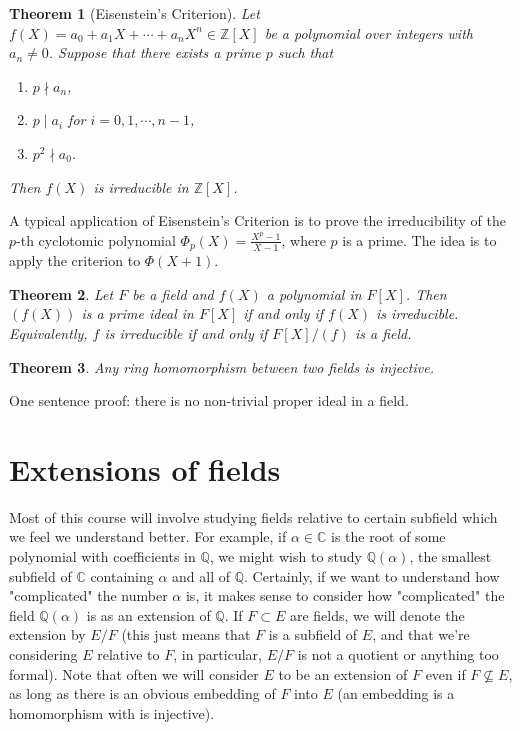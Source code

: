 \documentclass[12pt]{report}
\newtheorem{theorem}{Theorem}[section]
\theoremstyle{definition}
\newcommand{\ZZ}{\mathbb{Z}}
\newcommand{\CC}{\mathbb{C}}
\newcommand{\QQ}{\mathbb{Q}}
\begin{document}
\begin{theorem}[Eisenstein's Criterion]
	Let $f(X) = a_0+a_1X+\cdots+a_nX^n\in \ZZ[X]$ be a polynomial over integers with $a_n\not= 0$. Suppose that there exists a prime $p$ such that \begin{enumerate}
		\item  $p\nmid a_n$,
		\item  $p\mid a_i$  for  $i=0,1,\cdots,n-1$,
		\item  $p^2\nmid a_0$.
	\end{enumerate}
	Then $f(X)$ is irreducible in $\ZZ[X]$.
\end{theorem}

A typical application of Eisenstein's Criterion is to prove the irreducibility of the $p$-th cyclotomic polynomial $\Phi_p(X) = \frac{X^p-1}{X-1}$, where $p$ is a prime. The idea is to apply the criterion to $\Phi(X+1)$.

\begin{theorem}
	Let $F$ be a field and $f(X)$ a polynomial in $F[X]$. Then $(f(X))$ is a prime ideal in $F[X]$ if and only if $f(X)$ is irreducible. Equivalently, $f$ is irreducible if and only if $F[X]/(f)$ is a field.
\end{theorem}

\begin{theorem}
	Any ring homomorphism between two fields is injective.
\end{theorem}

\noindent One sentence proof: there is no non-trivial proper ideal in a field.

\section{Extensions of fields}

Most of this course will involve studying fields relative to certain subfield which we feel we understand better. For example, if $\alpha\in\CC$ is the root of some polynomial with coefficients in $\QQ$, we might wish to study $\QQ(\alpha)$, the smallest subfield of $\CC$ containing $\alpha$ and all of $\QQ$. Certainly, if we want to understand how "complicated" the number $\alpha$ is, it makes sense to consider how "complicated" the field $\QQ(\alpha)$ is as an extension of $\QQ$. If $F \subset E$ are fields, we will denote the extension by $E/F$ (this just means that $F$ is a subfield of $E$, and that we're considering $E$ relative to $F$, in particular, $E/F$ is not a quotient or anything too formal). Note that often we will consider $E$ to be an extension of $F$ even if $F\nsubseteq E$, as long as there is an obvious embedding of $F$ into $E$ (an embedding is a homomorphism with is injective).
\end{document}

